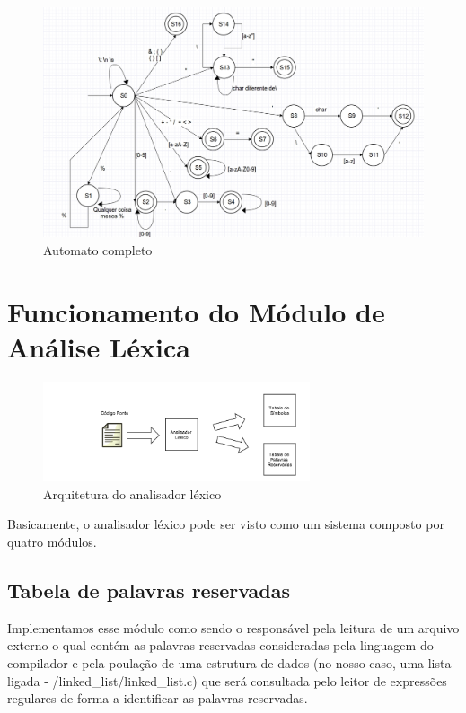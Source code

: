\begin{figure}[H]
  \caption{Automato completo}
  \centering
    \includegraphics[width=\textwidth]{../0-lexico/automatos/completo}
\end{figure}

\section{Funcionamento do Módulo de Análise Léxica}

\begin{figure}[H]
  \caption{Arquitetura do analisador léxico}
  \centering
    \includegraphics[width=0.7\textwidth]{../0-lexico/automatos/lexical_analyzer}
\end{figure}

Basicamente, o analisador léxico pode ser visto como um sistema composto por quatro módulos.

\subsection{Tabela de palavras reservadas}

Implementamos esse módulo como sendo o responsável pela leitura de um arquivo externo o qual contém as palavras reservadas consideradas pela linguagem do compilador e pela poulação de uma estrutura de dados (no nosso caso, uma lista ligada - /linked\_list/linked\_list.c) que será consultada pelo leitor de expressões regulares de forma a identificar as palavras reservadas.


